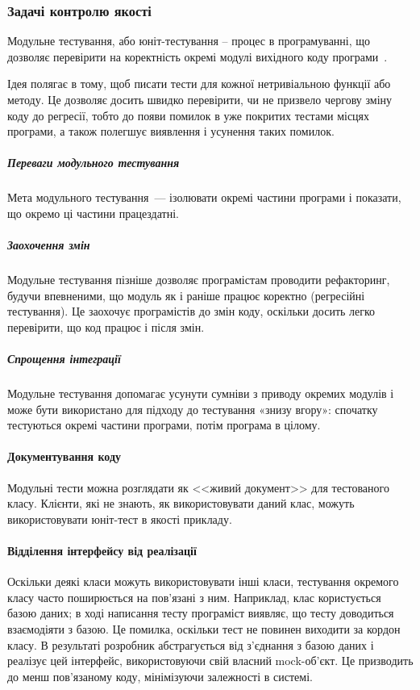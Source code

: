 \subsubsection{Задачі контролю якості}

Модульне тестування, або юніт-тестування -- процес в програмуванні, що дозволяє перевірити на коректність окремі модулі вихідного коду програми~\cite{бородіна2018selenium}.

Ідея полягає в тому, щоб писати тести для кожної нетривіальною функції або методу. Це дозволяє досить швидко перевірити, чи не призвело чергову зміну коду до регресії, тобто до появи помилок в уже покритих тестами місцях програми, а також полегшує виявлення і усунення таких помилок.

\subparagraph{Переваги модульного тестування}

Мета модульного тестування~--- ізолювати окремі частини програми і показати, що окремо ці частини працездатні.

\subparagraph{Заохочення змін}

Модульне тестування пізніше дозволяє програмістам проводити рефакторинг, будучи впевненими, що модуль як і раніше працює коректно (регресійні тестування). Це заохочує програмістів до змін коду, оскільки досить легко перевірити, що код працює і після змін.

\subparagraph{Спрощення інтеграції}
Модульне тестування допомагає усунути сумніви з приводу окремих модулів і може бути використано для підходу до тестування «знизу вгору»: спочатку тестуються окремі частини програми, потім програма в цілому.

\paragraph{Документування коду}

Модульні тести можна розглядати як <<живий документ>> для тестованого класу. Клієнти, які не знають, як використовувати даний клас, можуть використовувати юніт-тест в якості прикладу.

\paragraph{Відділення інтерфейсу від реалізації}

Оскільки деякі класи можуть використовувати інші класи, тестування окремого класу часто поширюється на пов'язані з ним. Наприклад, клас користується базою даних; в ході написання тесту програміст виявляє, що тесту доводиться взаємодіяти з базою. Це помилка, оскільки тест не повинен виходити за кордон класу. В результаті розробник абстрагується від з'єднання з базою даних і реалізує цей інтерфейс, використовуючи свій власний mock-об'єкт. Це призводить до менш пов'язаному коду, мінімізуючи залежності в системі.

